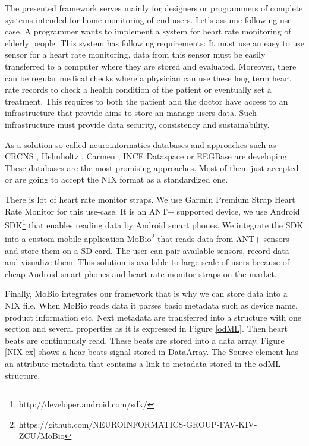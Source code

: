 \documentclass[conference]{IEEEtran}
\begin{document}
The presented framework serves mainly for designers or programmers of complete systems intended for home monitoring of end-users. Let's assume following use-case. A programmer wants to implement a system for heart rate monitoring of elderly people. This system has following requirements: It must use an easy to use sensor for a heart rate monitoring, data from this sensor must be easily transferred to a computer where they are stored and evaluated. Moreover, there can be regular medical checks where a physician can use these long term heart rate records to check a health condition of the patient or eventually set a treatment. This requires to both the patient and the doctor have access to an infrastructure that provide aims to store an manage users data. Such infrastructure must provide data security, consistency and sustainability.

As a solution so called neuroinformatics databases and approaches such as CRCNS \cite{CRCNS}, Helmholtz \cite{10.3389/conf.fninf.2013.09.00025}, Carmen \cite{fgibson:Watson2007}, INCF Dataspace \cite{dataspace} or EEGBase \cite{ISI:000306821100004} are developing. These databases are the most promising approaches. Most of them just accepted or are going to accept the NIX format as a standardized one.

There is lot of heart rate monitor straps. We use Garmin Premium Strap Heart Rate Monitor for this use-case. It is an ANT+ supported device, we use Android SDK\footnote{http://developer.android.com/sdk/} that enables reading data by Android smart phones. We integrate the SDK into a custom mobile application MoBio\footnote{https://github.com/NEUROINFORMATICS-GROUP-FAV-KIV-ZCU/MoBio} that reads data from ANT+ sensors and store them on a SD card. The user can pair available sensors, record data and visualize them. This solution is available to large scale of users because of cheap Android smart phones and heart rate monitor straps on the market.

Finally, MoBio integrates our framework that is why we can store data into a NIX file. When MoBio reads data it parses basic metadata such as device name, product information etc. Next metadata are transferred into a structure with one section and several properties as it is expressed in Figure \ref{odML}. Then heart beats are continuously read. These beats are stored into a data array. Figure \ref{NIX-ex} shows a hear beats signal stored in DataArray. The Source element has an attribute metadata that contains a link to metadata stored in the odML structure.
\end{document}
